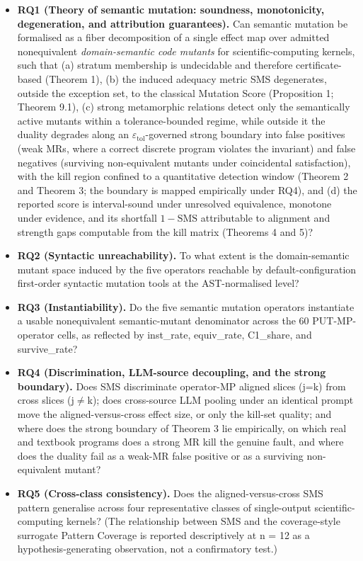 \documentclass[manuscript,screen,review]{acmart}
\begin{document}
\begin{itemize}

\item
  \textbf{RQ1 (Theory of semantic mutation: soundness, monotonicity,
  degeneration, and attribution guarantees).} Can semantic
  mutation be formalised as a fiber decomposition of a single effect map
  over admitted nonequivalent \emph{domain-semantic code mutants} for
  scientific-computing kernels, such that (a) stratum membership is
  undecidable and therefore certificate-based (Theorem 1), (b) the
  induced adequacy metric SMS degenerates, outside the exception set, to
  the classical Mutation Score (Proposition 1; Theorem 9.1), (c)
  strong metamorphic relations detect only the semantically active
  mutants within a tolerance-bounded regime, while outside it the duality
  degrades along an $\varepsilon_{\mathrm{tol}}$-governed strong boundary
  into false positives (weak MRs, where a correct discrete program
  violates the invariant) and false negatives (surviving non-equivalent
  mutants under coincidental satisfaction), with the kill region confined
  to a quantitative detection window (Theorem 2 and Theorem 3;
  the boundary is mapped empirically under RQ4), and (d) the reported
  score is interval-sound under unresolved equivalence, monotone under
  evidence, and its shortfall $1-\mathrm{SMS}$ attributable to alignment
  and strength gaps computable from the kill matrix (Theorems 4 and 5)?
\item
  \textbf{RQ2 (Syntactic unreachability).} To what extent is the
  domain-semantic mutant space induced by the five operators reachable
  by default-configuration first-order syntactic mutation tools at the
  AST-normalised level?
\item
  \textbf{RQ3 (Instantiability).} Do the five semantic mutation
  operators instantiate a usable nonequivalent semantic-mutant
  denominator across the 60 PUT-MP-operator cells, as reflected by
  inst\_rate, equiv\_rate, C1\_share, and survive\_rate?
\item
  \textbf{RQ4 (Discrimination, LLM-source decoupling, and the strong
  boundary).} Does SMS discriminate operator-MP aligned slices (j=k) from
  cross slices (j$\neq$k); does cross-source LLM pooling under an
  identical prompt move the aligned-versus-cross effect size, or only the
  kill-set quality; and where does the strong boundary of Theorem 3
  lie empirically, on which real and textbook programs does a strong
  MR kill the genuine fault, and where does the duality fail as a weak-MR
  false positive or as a surviving non-equivalent mutant?
\item
  \textbf{RQ5 (Cross-class consistency).} Does the aligned-versus-cross
  SMS pattern generalise across four representative classes of
  single-output scientific-computing kernels? (The relationship between
  SMS and the coverage-style surrogate Pattern Coverage is reported
  descriptively at n = 12 as a hypothesis-generating observation, not a
  confirmatory test.)
\end{itemize}
\end{document}
